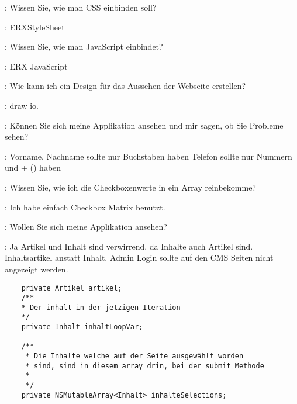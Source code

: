 \documentclass[a4paper, 11pt]{article}
\begin{document}
\begin{drama}
\msspeaks: Wissen Sie, wie man CSS einbinden soll?

\lucasspeaks: ERXStyleSheet

\msspeaks: Wissen Sie, wie man JavaScript einbindet?

\lucasspeaks: ERX JavaScript

\msspeaks: Wie kann ich ein Design für das Aussehen der Webseite erstellen?

\lucasspeaks: draw io.

\msspeaks: Können Sie sich meine Applikation ansehen und mir sagen, ob Sie Probleme sehen?

\lucasspeaks:
    Vorname, Nachname sollte nur Buchstaben haben
    Telefon sollte nur Nummern und + () haben

\msspeaks: Wissen Sie, wie ich die Checkboxenwerte in ein Array reinbekomme?

\standhardspeaks: Ich habe einfach Checkbox Matrix benutzt.

\msspeaks: Wollen Sie sich meine Applikation ansehen?

\fuscospeaks: Ja
    Artikel und Inhalt sind verwirrend. da Inhalte auch Artikel sind. Inhaltsartikel anstatt Inhalt.
    Admin Login sollte auf den CMS Seiten nicht angezeigt werden.

\end{drama}

\begin{verbatim}
	private Artikel artikel;
	/**
	* Der inhalt in der jetzigen Iteration
	*/
	private Inhalt inhaltLoopVar;
	
	/**
	 * Die Inhalte welche auf der Seite ausgewählt worden
	 * sind, sind in diesem array drin, bei der submit Methode
	 * 
	 */
	private NSMutableArray<Inhalt> inhalteSelections;
	\end{verbatim}
\end{document}
